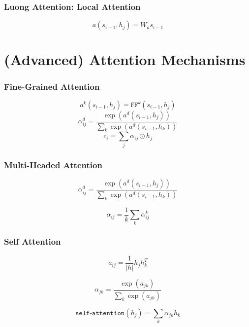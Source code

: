 \documentclass{beamer}
\begin{document}
\begin{frame}
\frametitle{Luong Attention: Local Attention}
\begin{equation*}
  a\left( s_{i-1}, h_j \right) = W_a s_{i-1}
\end{equation*}
\end{frame}

\section{(Advanced) Attention Mechanisms}

\begin{frame}
\frametitle{Fine-Grained Attention}
\begin{equation*}
  a^k \left( s_{i-1}, h_j \right) = \texttt{FF}^k(s_{i-1}, h_j)
\end{equation*}
\begin{equation*}
  \alpha_{ij}^d = \frac{\exp\left(a^d\left(s_{i-1}, h_j\right)\right)}{\sum_k \exp \left( a^d \left(s_{i-1}, h_k\right) \right)}
\end{equation*}
\begin{equation*}
  c_i = \sum_j \alpha_{ij} \odot h_j
\end{equation*}
\end{frame}

\begin{frame}
\frametitle{Multi-Headed Attention}
\begin{equation*}
  \alpha_{ij}^d = \frac{\exp\left(a^d\left(s_{i-1}, h_j\right)\right)}{\sum_k \exp \left( a^d \left(s_{i-1}, h_k\right) \right)}
\end{equation*}

\begin{equation*}
  \alpha_{ij} = \frac{1}{k} \sum_k \alpha^k_{ij}
\end{equation*}
\end{frame}

\begin{frame}
\frametitle{Self Attention}
\begin{equation*}
  a_{ij} = \frac{1}{|h|} h_{j}h_k^T
\end{equation*}

\begin{equation*}
  \alpha_{jk} = \frac{\exp\left( a_{jk} \right)}{\sum_k \exp \left( a_{jk} \right)}
\end{equation*}

\begin{equation*}
  \texttt{self-attention}\left( h_j \right) = \sum_k \alpha_{jk} h_k
\end{equation*}
\end{frame}
\end{document}
